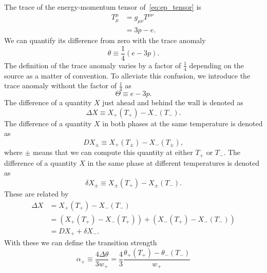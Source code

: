 
The trace of the energy-momentum tensor of~\eqref{eq:ep_tensor} is
\begin{align}
T^\mu_\mu
&= g_{\mu \nu} T^{\mu \nu} \\
&=3p - e.
\end{align}
We can quantify its difference from zero with the trace anomaly
\cites[eq. 7.24]{lecture_notes}[eq. 28]{giese_2020}
\begin{equation}
\theta \equiv \frac{1}{4}(e-3p).
\label{eq:theta}
\end{equation}
The definition of the trace anomaly varies by a factor of $\frac{1}{4}$ depending on the source as a matter of convention.
To alleviate this confusion, we introduce the trace anomaly without the factor of $\frac{1}{4}$ as
\begin{equation}
\Theta \equiv e - 3p.
\label{eq:theta_big}
\end{equation}
The difference of a quantity $X$ just ahead and behind the wall is denoted as
\begin{equation}
\Delta X
\equiv X_+(T_+) - X_-(T_-). %
\end{equation}
The difference of a quantity $X$ in both phases at the same temperature is denoted as
\begin{equation}
DX_\pm \equiv X_+(T_\pm) - X_-(T_\pm),
\end{equation}
where $\pm$ means that we can compute this quantity at either $T_+$ or $T_-$.
The difference of a quantity $X$ in the same phase at different temperatures is denoted as
\begin{equation}
\delta X_\pm \equiv X_\pm(T_+) - X_\pm(T_-).
\end{equation}
These are related by
\begin{align}
\Delta X
&= X_+(T_+) - X_-(T_-) \\
&= \left( X_+(T_+) - X_-(T_+) \right) + \left( X_-(T_+) - X_-(T_-) \right) \\
&= DX_+ + \delta X_-.
\label{eq:delta_relation}
\end{align}
With these we can define the transition strength
\begin{equation}
\alpha_+
\equiv \frac{4 \Delta \theta}{3 w_+}
= \frac{4}{3} \frac{\theta_+(T_+) - \theta_-(T_-)}{w_+}
\label{eq:alpha_plus}
\end{equation}
